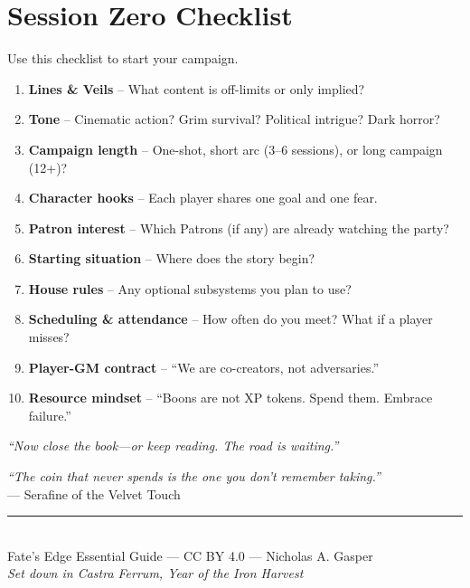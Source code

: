\documentclass[10pt]{article}
\begin{document}
\section{Session Zero Checklist}
Use this checklist to start your campaign.
\begin{enumerate}[leftmargin=*]
    \item \textbf{Lines \& Veils} – What content is off-limits or only implied?
    \item \textbf{Tone} – Cinematic action? Grim survival? Political intrigue? Dark horror?
    \item \textbf{Campaign length} – One-shot, short arc (3–6 sessions), or long campaign (12+)?
    \item \textbf{Character hooks} – Each player shares one goal and one fear.
    \item \textbf{Patron interest} – Which Patrons (if any) are already watching the party?
    \item \textbf{Starting situation} – Where does the story begin?
    \item \textbf{House rules} – Any optional subsystems you plan to use?
    \item \textbf{Scheduling \& attendance} – How often do you meet? What if a player misses?
    \item \textbf{Player-GM contract} – ``We are co-creators, not adversaries.''
    \item \textbf{Resource mindset} – ``Boons are not XP tokens. Spend them. Embrace failure.''
\end{enumerate}
\textit{``Now close the book—or keep reading. The road is waiting.''}

\newpage
\thispagestyle{empty}
\vspace*{2cm}
\begin{center}
    {\LARGE\sffamily\itshape ``The coin that never spends is the one you don't remember taking.''}\\[1.5em]
    — Serafine of the Velvet Touch\\[2em]
    \rule{0.5\textwidth}{0.5pt}\\[1.5em]
    {\small Fate's Edge Essential Guide — CC BY 4.0 — Nicholas A. Gasper}\\[0.5em]
    {\tiny \textit{Set down in Castra Ferrum, Year of the Iron Harvest}}
\end{center}
\vspace*{1.5cm}
\end{document}
